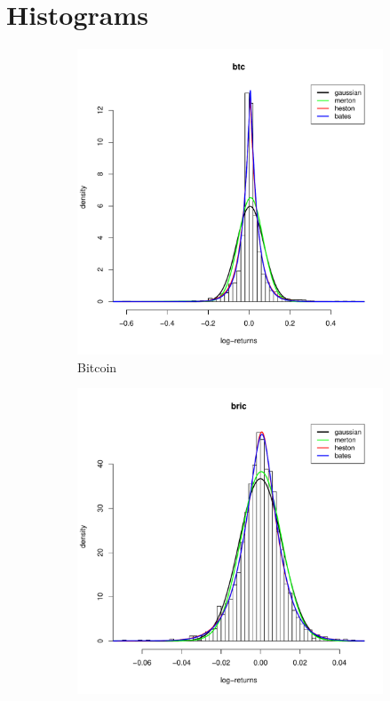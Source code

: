 \chapter{Histograms}
\label{app:hist}



\begin{figure}
	\small
	\centering
	\begin{subfigure}{0.44\textwidth}
		\centering
		\includegraphics[width=\linewidth]{Images/hist_btc.pdf}
		\caption{Bitcoin}
	\end{subfigure}
	\begin{subfigure}{0.44\textwidth}
		\centering
		\includegraphics[width=\linewidth]{Images/hist_bric.pdf}

\end{subfigure}
\end{figure}
